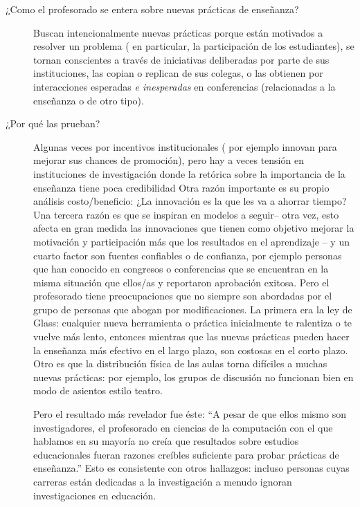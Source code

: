\begin{description}

\item[¿Como el profesorado se entera sobre nuevas prácticas de enseñanza?]

Buscan intencionalmente nuevas prácticas
porque están motivados a resolver un problema ( en particular, la participación de los estudiantes),
se tornan conscientes a través de iniciativas deliberadas por parte de sus instituciones,
las copian o replican de sus colegas,
o las obtienen por interacciones esperadas  \emph{e inesperadas} en conferencias
(relacionadas a la enseñanza o de otro tipo).

\item[¿Por qué las prueban?]

Algunas veces por incentivos institucionales
( por ejemplo innovan para mejorar sus chances de promoción),
pero hay a veces tensión en instituciones de investigación
donde la retórica sobre la importancia de la enseñanza tiene poca credibilidad
Otra razón importante es su propio análisis costo/beneficio:
¿La innovación es la que les va a ahorrar tiempo?
Una tercera razón es que se inspiran en modelos a seguir-- otra vez,
esto afecta en gran medida las innovaciones que tienen como objetivo mejorar la motivación y participación más que los resultados en el aprendizaje
-- y un cuarto factor son fuentes confiables o de confianza,
por ejemplo personas que han  conocido en congresos o conferencias que se encuentran en la misma situación que ellos/as 
y reportaron aprobación exitosa.
Pero el profesorado tiene preocupaciones que no siempre son abordadas por el grupo de personas que abogan por modificaciones.
La primera era la ley de Glass:
cualquier nueva herramienta o práctica inicialmente te ralentiza o  te vuelve más lento,
entonces mientras que las nuevas prácticas pueden hacer la enseñanza más efectivo en el largo plazo, son costosas en el corto plazo.
Otro es que la distribución física de las aulas torna difíciles a muchas nuevas prácticas:
por ejemplo,
los grupos de discusión no funcionan bien en modo de asientos estilo teatro.

Pero el resultado más revelador fue éste:
``A pesar de que ellos mismo son investigadores,
el profesorado en ciencias de la computación con el que hablamos en su mayoría no creía
que resultados sobre estudios educacionales fueran razones creíbles suficiente para probar prácticas de enseñanza.''
Esto es consistente con otros hallazgos:
incluso personas cuyas carreras están dedicadas  a la investigación a menudo ignoran investigaciones en educación. 



\end{description}
